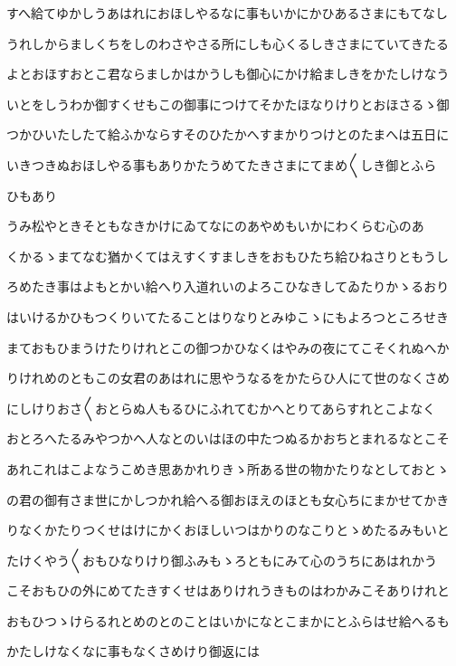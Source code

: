 \documentclass[a4paper,11pt,landscape]{ltjtarticle}
\begin{document}
すへ給てゆかしうあはれにおほしやるなに事もいかにかひあるさまにもてなし
\par\medskip
うれしからましくちをしのわさやさる所にしも心くるしきさまにていてきたる
\par\medskip
よとおほすおとこ君ならましかはかうしも御心にかけ給ましきをかたしけなう
\par\medskip
いとをしうわか御すくせもこの御事につけてそかたほなりけりとおほさるゝ御
\par\medskip
つかひいたしたて給ふかならすそのひたかへすまかりつけとのたまへは五日に
\par\medskip
いきつきぬおほしやる事もありかたうめてたきさまにてまめ〱しき御とふら
\par\medskip
ひもあり
\par\medskip
うみ松やときそともなきかけにゐてなにのあやめもいかにわくらむ心のあ
\par\medskip
くかるゝまてなむ猶かくてはえすくすましきをおもひたち給ひねさりともうし
\par\medskip
ろめたき事はよもとかい給へり入道れいのよろこひなきしてゐたりかゝるおり
\par\medskip
はいけるかひもつくりいてたることはりなりとみゆこゝにもよろつところせき
\par\medskip
まておもひまうけたりけれとこの御つかひなくはやみの夜にてこそくれぬへか
\par\medskip
りけれめのともこの女君のあはれに思やうなるをかたらひ人にて世のなくさめ
\par\medskip
にしけりおさ〱おとらぬ人もるひにふれてむかへとりてあらすれとこよなく
\par\medskip
おとろへたるみやつかへ人なとのいはほの中たつぬるかおちとまれるなとこそ
\par\medskip
あれこれはこよなうこめき思あかれりきゝ所ある世の物かたりなとしておとゝ
\par\medskip
の君の御有さま世にかしつかれ給へる御おほえのほとも女心ちにまかせてかき
\par\medskip
りなくかたりつくせはけにかくおほしいつはかりのなこりとゝめたるみもいと
\par\medskip
たけくやう〱おもひなりけり御ふみもゝろともにみて心のうちにあはれかう
\par\medskip
こそおもひの外にめてたきすくせはありけれうきものはわかみこそありけれと
\par\medskip
おもひつゝけらるれとめのとのことはいかになとこまかにとふらはせ給へるも
\par\medskip
かたしけなくなに事もなくさめけり御返には
\par\medskip
\end{document}

